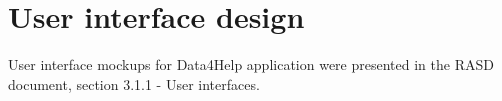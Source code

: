 \documentclass[DD.tex]{subfiles}
\begin{document}
\section{User interface design}
User interface mockups for Data4Help application were presented in the RASD document, section 3.1.1 - User interfaces.
\newpage
\end{document}
